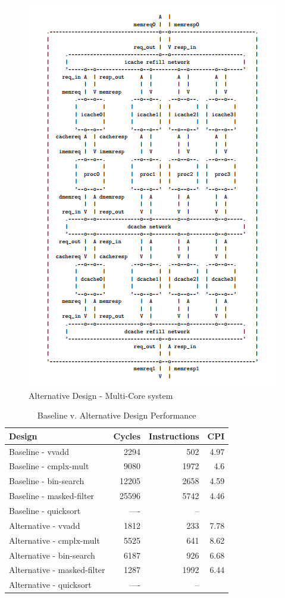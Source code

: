 \documentclass[10pt]{article}
\begin{document}
\begin{figure}[H]
	\centering
	\includegraphics{alt_diag}
	\caption{Alternative Design - Multi-Core system}
	\label{fig:alt}
\end{figure}

\begin{table}[H]
\centering
	\begin{tabular} {|l | r | r | r |}
	\hline
	\textbf{Design}    & \textbf{Cycles} & \textbf{Instructions} & \textbf{CPI} \\
	\hline
	Baseline - vvadd       		&  2294  &  502   &  4.97   \\
	Baseline - cmplx-mult  		&  9080  &  1972  &  4.6  	\\
	Baseline - bin-search       &  12205 &  2658  &  4.59   \\
	Baseline - masked-filter    &  25596 &  5742  &  4.46   \\
	Baseline - quicksort        &  ----  &  --    &      	\\
	\hline
	Alternative - vvadd    		&  1812  &  233   &  7.78   \\
	Alternative - cmplx-mult    &  5525  &  641   &  8.62   \\
	Alternative - bin-search    &  6187  &  926   &  6.68   \\
	Alternative - masked-filter &  1287  &  1992  &  6.44   \\
	Alternative - quicksort    	&  ----  &  --    &         \\
	\hline                    
	\end{tabular}
	\caption{Baseline v. Alternative Design Performance}
	\label{tab:eval}
\end{table}

\end{document}
